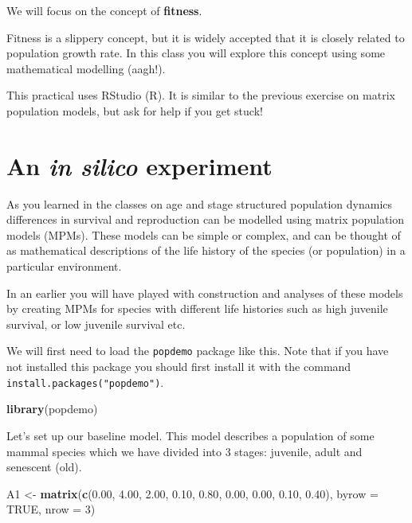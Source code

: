 \documentclass[
  a4paper]{book}
\newenvironment{Shaded}{\begin{snugshade}}{\end{snugshade}}
\newcommand{\AttributeTok}[1]{\textcolor[rgb]{0.13,0.29,0.53}{#1}}
\newcommand{\ConstantTok}[1]{\textcolor[rgb]{0.56,0.35,0.01}{#1}}
\newcommand{\DecValTok}[1]{\textcolor[rgb]{0.00,0.00,0.81}{#1}}
\newcommand{\FloatTok}[1]{\textcolor[rgb]{0.00,0.00,0.81}{#1}}
\newcommand{\FunctionTok}[1]{\textcolor[rgb]{0.13,0.29,0.53}{\textbf{#1}}}
\newcommand{\NormalTok}[1]{#1}
\newcommand{\OtherTok}[1]{\textcolor[rgb]{0.56,0.35,0.01}{#1}}
\begin{document}
We will focus on the concept of \textbf{fitness}.

Fitness is a slippery concept, but it is widely accepted that it is closely related to population growth rate. In this class you will explore this concept using some mathematical modelling (aagh!).

\begin{do-something}
This practical uses RStudio (R). It is similar to the previous exercise
on matrix population models, but ask for help if you get stuck!
\end{do-something}

\section{\texorpdfstring{An \emph{in silico} experiment}{An in silico experiment}}\label{an-in-silico-experiment}

As you learned in the classes on age and stage structured population dynamics differences in survival and reproduction can be modelled using matrix population models (MPMs). These models can be simple or complex, and can be thought of as mathematical descriptions of the life history of the species (or population) in a particular environment.

In an earlier you will have played with construction and analyses of these models by creating MPMs for species with different life histories such as high juvenile survival, or low juvenile survival etc.

We will first need to load the \texttt{popdemo} package like this. Note that if you have not installed this package you should first install it with the command \texttt{install.packages("popdemo")}.

\begin{Shaded}
\begin{Highlighting}[]
\FunctionTok{library}\NormalTok{(popdemo)}
\end{Highlighting}
\end{Shaded}

Let's set up our baseline model. This model describes a population of some mammal species which we have divided into 3 stages: juvenile, adult and senescent (old).

\begin{Shaded}
\begin{Highlighting}[]
\NormalTok{A1 }\OtherTok{\textless{}{-}} \FunctionTok{matrix}\NormalTok{(}\FunctionTok{c}\NormalTok{(}\FloatTok{0.00}\NormalTok{, }\FloatTok{4.00}\NormalTok{, }\FloatTok{2.00}\NormalTok{, }
               \FloatTok{0.10}\NormalTok{, }\FloatTok{0.80}\NormalTok{, }\FloatTok{0.00}\NormalTok{, }
               \FloatTok{0.00}\NormalTok{, }\FloatTok{0.10}\NormalTok{, }\FloatTok{0.40}\NormalTok{), }
            \AttributeTok{byrow =} \ConstantTok{TRUE}\NormalTok{, }\AttributeTok{nrow =} \DecValTok{3}\NormalTok{)}
\end{Highlighting}
\end{Shaded}
\end{document}
